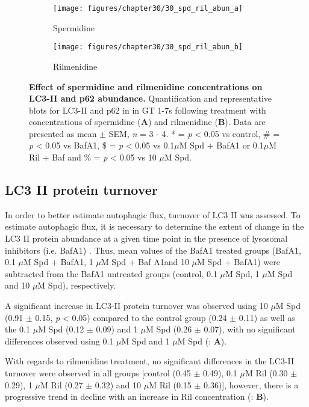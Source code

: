 {\begin{landscape}
\begin{figure}[!htbp]
  \centering
  \begin{subfigure}[b]{0.35\linewidth}
    \texttt{[image: figures/chapter30/30\_spd\_ril\_abun\_a]}
    \caption{Spermidine}
  \end{subfigure}
  \begin{subfigure}[b]{0.35\linewidth}
    \texttt{[image: figures/chapter30/30\_spd\_ril\_abun\_b]}
    \caption{Rilmenidine}
  \end{subfigure}
  \caption[Effect of spermidine and rilmenidine concentrations on LC3-II and p62 abundance]{\textbf{Effect of spermidine and rilmenidine concentrations on LC3-II and p62 abundance.} Quantification and representative blots for LC3-II and p62 in in GT 1-7s following treatment with concentrations of spermidine (\textbf{A}) and rilmenidine (\textbf{B}). Data are presented as mean $\pm$ SEM, \textit{n} = 3 - 4. * = \textit{p} < 0.05 vs control, \# = \textit{p} < 0.05 vs BafA1, \$ = \textit{p} < 0.05 vs 0.1$\mu$M Spd + BafA1 or 0.1$\mu$M Ril + Baf and \% = \textit{p} < 0.05 vs 10 $\mu$M Spd.}
  \label{fig:30_spd_ril_abun_a}
\end{figure}
\end{landscape}

\subsection{LC3 II protein turnover}
In order to better estimate autophagic flux, turnover of LC3 II was assessed. To estimate autophagic flux, it is necessary to determine the extent of change in the LC3 II protein abundance at a given time point in the presence of lysosomal inhibitors (i.e. BafA1) \citep{Martinez-Lopez2013}. Thus, mean values of the BafA1 treated groups (BafA1, 0.1 $\mu$M Spd + BafA1, 1 $\mu$M Spd + Baf A1and 10 $\mu$M Spd + BafA1) were subtracted from the BafA1 untreated groups (control, 0.1 $\mu$M Spd, 1 $\mu$M Spd and 10 $\mu$M Spd), respectively.

A significant increase in LC3-II protein turnover was observed using 10 $\mu$M Spd (0.91 $\pm$ 0.15, \textit{p} < 0.05) compared to the control group (0.24 $\pm$ 0.11) as well as the 0.1 $\mu$M Spd (0.12 $\pm$ 0.09) and 1 $\mu$M Spd (0.26 $\pm$ 0.07), with no significant differences observed using 0.1 $\mu$M Spd  and 1 $\mu$M Spd (: \textbf{A}). 

With regards to rilmenidine treatment, no significant differences in the LC3-II turnover were observed in all groups [control (0.45 $\pm$ 0.49), 0.1 $\mu$M Ril (0.30 $\pm$ 0.29), 1 $\mu$M Ril (0.27 $\pm$ 0.32) and 10 $\mu$M Ril (0.15 $\pm$ 0.36)], however, there is a progressive trend in decline with an increase in Ril concentration (: \textbf{B}). 

}
